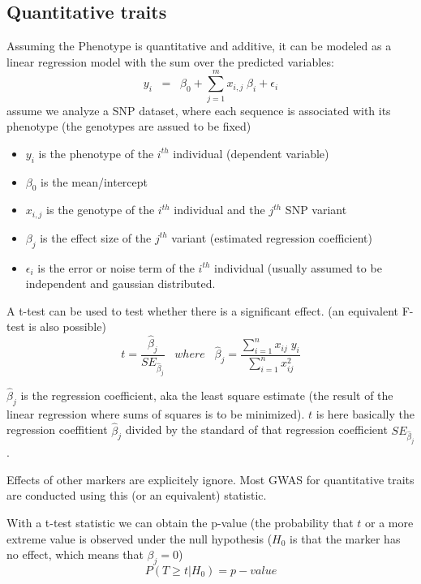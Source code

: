 \documentclass{article}
\begin{document}
\subsection{Quantitative traits}
Assuming the Phenotype is quantitative and additive, it can be modeled as a linear regression model with the sum over the predicted variables:
\begin{equation*}
y_i \;\; = \;\; \beta_0 + \sum^m_{j=1} x_{i, j} \; \beta _i +\epsilon_i
\end{equation*}
assume we analyze a SNP dataset, where each sequence is associated with its phenotype (the genotypes are assued to be fixed)
\begin{itemize}
\item $y_i$ is the phenotype of the $i^{th}$ individual (dependent variable)
\item $\beta _0$ is the mean/intercept
\item $x_{i,j}$ is the genotype of the $i^{th}$ individual and the $j^{th}$ SNP variant
\item $\beta_j$ is the effect size of the $j^{th}$ variant (estimated regression coefficient)
\item $\epsilon_i$ is the error or noise term of the $i^{th}$ individual (usually assumed to be independent and gaussian distributed.
\end{itemize}
A t-test can be used to test whether there is a significant effect. (an equivalent F-test is also possible)
\begin{equation*}
t = \frac{\hat{\beta}_j}{S E _{\hat{\beta}_j}} \;\;\; where \;\;\; \hat{\beta}_j = \frac{\sum^n _{i=1} x_{ij} \; y_i}{\sum^n _{i=1} x_{ij}^2}
\end{equation*}

$\hat{\beta}_j$ is the regression coefficient, aka the least square estimate (the result of the linear regression where sums of squares is to be minimized). $t$ is here basically the regression coeffitient $\hat{\beta}_j$ divided by the standard of that regression coefficient $SE_{\hat{\beta}_j}$.\par 
Effects of other markers are explicitely ignore. Most GWAS for quantitative traits are conducted using this (or an equivalent) statistic.\par 

With a t-test statistic we can obtain the p-value (the probability that $t$  or a more extreme value is observed under the null hypothesis ($H_0$ is that the marker has no effect, which means that $\beta_j = 0$)
\begin{equation*}
P(T \geq t|H_0) = p-value
\end{equation*}
\end{document}
